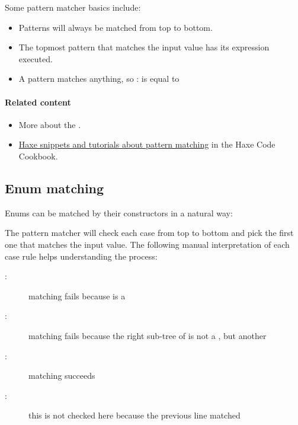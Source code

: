 
Some pattern matcher basics include:

\begin{itemize}
	\item Patterns will always be matched from top to bottom.
	\item The topmost pattern that matches the input value has its expression executed.
	\item A \expr{_} pattern matches anything, so : is equal to 
\end{itemize}

\paragraph{Related content}
\begin{itemize}
	\item More about the .
	\item \href{http://code.haxe.org/tag/pattern-matching.html}{Haxe snippets and tutorials about pattern matching} in the Haxe Code Cookbook.
\end{itemize}

\subsection{Enum matching}
\label{lf-pattern-matching-enums}

Enums can be matched by their constructors in a natural way:


The pattern matcher will check each case from top to bottom and pick the first one that matches the input value. The following manual interpretation of each case rule helps understanding the process:

\begin{description}
	\item[:] matching fails because  is a 
	\item[:] matching fails because the right sub-tree of  is not a , but another 
	\item[:] matching succeeds
	\item[:] this is not checked here because the previous line matched
\end{description}

